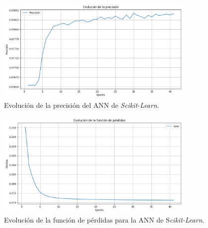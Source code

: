 \begin{figure}[H]
  \centering
  \includegraphics[width=0.85\textwidth]{fig/06_fault_sg/fault_sg_14.png}
  \caption{Evolución de la precisión del ANN de \textit{Scikit-Learn}.}
  \label{fig:fault_sg_14}
\end{figure}

\begin{figure}[H]
  \centering
  \includegraphics[width=0.85\textwidth]{fig/06_fault_sg/fault_sg_15.png}
  \caption{Evolución de la función de pérdidas para la ANN de S\textit{cikit-Learn}.}
  \label{fig:fault_sg_15}
\end{figure}


